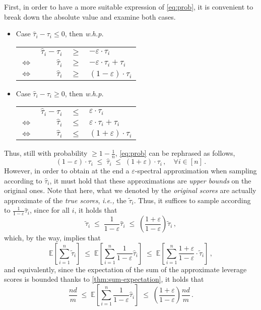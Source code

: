 \begin{proofEnd}
First, in order to have a more suitable expression of \autoref{eq:prob}, it is
convenient to break down the absolute value and examine both cases.
\begin{itemize}
    \item Case  $\hat \tau_i - \tau_i \leq 0$, then \textit{w.h.p.}
    \begin{table}[H]
        \centering
        \begin{tabular}{lrll}
        & $\hat \tau_i - \tau_i$ & $\geq$ & $- \varepsilon \cdot \tau_i$ \\
        $\Leftrightarrow$ & $\hat \tau_i$ & $\geq$ & $- \varepsilon \cdot \tau_i + \tau_i$ \\
        $\Leftrightarrow$ & $\hat \tau_i$ & $\geq$ & $(1 - \varepsilon) \cdot \tau_i$
        \end{tabular}
    \end{table}
    \item Case  $\hat \tau_i - \tau_i \geq 0$, then \textit{w.h.p.}
    \begin{table}[H]
        \centering
        \begin{tabular}{lrll}
            & $\hat \tau_i - \tau_i$ & $\leq$ & $\varepsilon \cdot \tau_i$ \\
            $\Leftrightarrow$ & $\hat \tau_i$ & $\leq$ & $\varepsilon \cdot \tau_i + \tau_i$ \\
            $\Leftrightarrow$ & $\hat \tau_i$ & $\leq$ & $(1 + \varepsilon) \cdot \tau_i$
        \end{tabular}
    \end{table}
\end{itemize}

Thus, still with probability $\geq 1 - \frac{1}{n}$, \autoref{eq:prob} can be
rephrased as follows,
$$
(1 - \varepsilon) \cdot \tau_i
    \; \leq \; \hat \tau_i
    \; \leq \; (1 + \varepsilon) \cdot \tau_i \, , \quad \forall i \in [n] \, .
$$
However, in order to obtain at the end a $\varepsilon$-spectral approximation
when sampling according to $\hat \tau_i$, it must hold that these approximations
are \textit{upper bounds} on the original ones. Note that here, what we denoted
by the \textit{original scores} are actually approximate of the \textit{true
scores}, \textit{i.e.,} the $\tilde\tau_i$. Thus, it suffices to sample
according to $\frac{1}{1-\varepsilon} \hat\tau_i$, since for all $i$, it holds
that
$$
\tilde \tau_i
    \; \leq \; \frac{1}{1-\varepsilon}\hat \tau_i
    \; \leq \; (\frac{1 + \varepsilon}{1-\varepsilon}) \tilde\tau_i \, ,
$$
which, by the way, implies that
$$
\mathbb E \left [\sum_{i=1}^n \tilde\tau_i \right ]
    \; \leq \; \mathbb E \left [\sum_{i=1}^n \frac{1}{1-\varepsilon}\hat \tau_i \right ]
    \; \leq \; \mathbb E \left [\sum_{i=1}^n \frac{1 + \varepsilon}{1-\varepsilon} \cdot \tilde\tau_i \right ] \, ,
$$
and equivalently, since the expectation of the sum of the approximate leverage
scores is bounded thanks to \autoref{thm:sum-expectation}, it holds that
$$
\frac{nd}{m}
    \; \leq \; \mathbb E \left [\sum_{i=1}^n \frac{1}{1-\varepsilon}\hat \tau_i \right ]
    \; \leq \; (\frac{1 + \varepsilon}{1-\varepsilon}) \frac{nd}{m} \, .
$$


\end{proofEnd}
